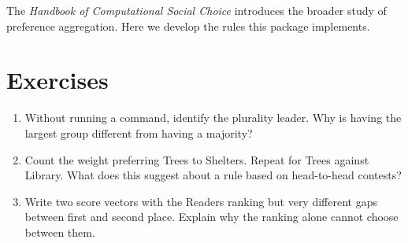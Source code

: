 The \emph{Handbook of Computational Social Choice} introduces the broader study of preference aggregation.\cite{handbook} Here we develop the rules this package implements.

\section{Exercises}
\begin{enumerate}
\item Without running a command, identify the plurality leader. Why is having the largest group different from having a majority?
\item Count the weight preferring Trees to Shelters. Repeat for Trees against Library. What does this suggest about a rule based on head-to-head contests?
\item Write two score vectors with the Readers ranking but very different gaps between first and second place. Explain why the ranking alone cannot choose between them.
\end{enumerate}
